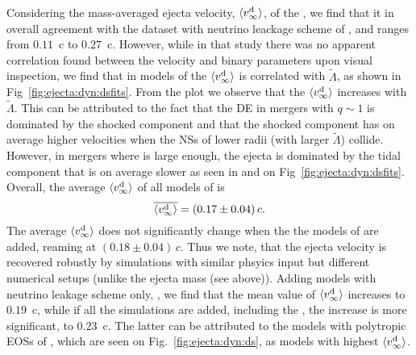 Considering the mass-averaged ejecta velocity, $\langle v^{\text{d}}_\infty\rangle$, of the \DSrefset{}, we 
find that it in overall agreement with the dataset with neutrino leackage scheme 
of \citet{Radice:2018pdn}, and ranges from $0.11$~c to $0.27$~c. However, while in 
that study there was no apparent correlation found between the velocity and binary 
parameters upon visual inspection, we find that in models of \DSrefset{} the $\langle v^{\text{d}}_\infty\rangle$ 
is correlated with $\tilde{\Lambda}$, as shown in Fig~\ref{fig:ejecta:dyn:dsfits}.
%
From the plot we observe that the $\langle v^{\text{d}}_\infty\rangle$ increases with $\tilde{\Lambda}$. This can 
be attributed to the fact that the \ac{DE} in mergers with $q\sim1$ is dominated by the 
shocked component and that the shocked component has on average higher velocities when 
the \acp{NS} of lower radii (with larger $\tilde{\Lambda}$) collide.
%
However, in mergers where \mr{} is large enough, the ejecta is dominated by the tidal 
component that is on average slower as seen in \DSrefset{} and on 
Fig~\ref{fig:ejecta:dyn:dsfits}.
%
Overall, the average $\langle v^{\text{d}}_\infty\rangle$ of all models of \DSrefset{} is 
%
\begin{equation}
\label{eq:ejecta:dyn:avg:v}
\overline{\langle v^{\text{d}}_\infty\rangle} = (0.17\pm0.04)\,c . 
\end{equation}
%
The average $\langle v^{\text{d}}_\infty\rangle$ does not significantly change when the the models of \DSheatcool{} 
are added, reaming at $(0.18 \pm 0.04) \, c$.
Thus we note, that the ejecta velocity is recovered robustly by simulations with 
similar phsyics input but different numerical setups (unlike the ejecta mass (see above)).
%
Adding models with neutrino leakage scheme only, \DScool{}, we find that the mean value of 
$\langle v^{\text{d}}_\infty\rangle$ increases to $0.19$~c, while if all the simulations are added, including the \DSnone{}, 
the increase is more significant, to $0.23$~c. The latter can be attributed to the models 
with polytropic \acp{EOS} of \citet{Bauswein:2013yna}, which are seen on 
Fig.~\ref{fig:ejecta:dyn:ds}, as models with highest $\langle v^{\text{d}}_\infty\rangle$.


